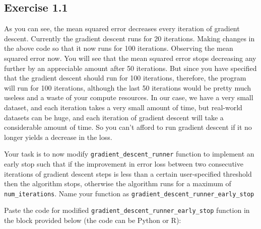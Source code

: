 \documentclass[11pt]{article}
\begin{document}
    \hypertarget{exercise-1.1}{%
\subsection{Exercise 1.1 }\label{exercise-1.1}}

As you can see, the mean squared error decreases every iteration of
gradient descent. Currently the gradient descent runs for 20 iterations.
Making changes in the above code so that it now runs for 100 iterations.
Observing the mean squared error now. You will see that the mean squared
error stops decreasing any further by an appreciable amount after 50
iterations. But since you have specified that the gradient descent
should run for 100 iterations, therefore, the program will run for 100
iterations, although the last 50 iterations would be pretty much useless
and a waste of your compute resources. In our case, we have a very small
dataset, and each iteration takes a very small amount of time, but
real-world datasets can be huge, and each iteration of gradient descent
will take a considerable amount of time. So you can't afford to run
gradient descent if it no longer yields a decrease in the loss.

Your task is to now modify \texttt{gradient\_descent\_runner} function
to implement an early stop such that if the improvement in error loss
between two consecutive iterations of gradient descent steps is less
than a certain user-specified threshold then the algorithm stops,
otherwise the algorithm runs for a maximum of \texttt{num\_iterations}.
Name your function as \texttt{gradient\_descent\_runner\_early\_stop}

Paste the code for modified
\texttt{gradient\_descent\_runner\_early\_stop} function in the block
provided below (the code can be Python or R):
\end{document}
